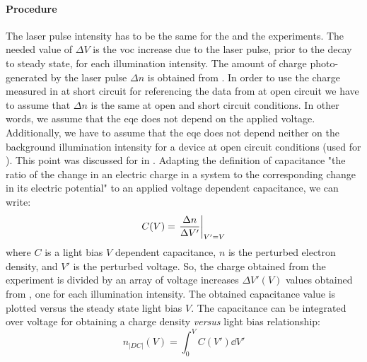 	\paragraph{Procedure}
	The laser pulse intensity has to be the same for the  and the  experiments.
	The needed value of $\Delta V$ is the \gls{voc} increase due to the laser pulse, prior to the decay to steady state, for each illumination intensity.
	The amount of charge photo\hyp{}generated by the laser pulse $\Delta n$ is obtained from .
	In order to use the charge measured in  at short circuit for referencing the data from  at open circuit we have to assume that $\Delta n$ is the same at open and short circuit conditions.
	In other words, we assume that the \gls{eqe} does not depend on the applied voltage.
	Additionally, we have to assume that the \gls{eqe} does not depend neither on the background illumination intensity for a device at open circuit conditions (used for ).
	This point was discussed for  in .
	Adapting the definition of capacitance "the ratio of the change in an electric charge in a system to the corresponding change in its electric potential" \cite{WikipediaCapacitance2019} to an applied voltage dependent capacitance, we can write:
	\begin{equation}\label{eq:dc}
		C(V) = \eval{\frac{\Delta n}{\Delta V'}}_{V'=V}
	\end{equation}
	where $C$ is a light bias $V$ dependent capacitance, $n$ is the perturbed electron density, and $V'$ is the perturbed voltage.
	So, the charge obtained from the  experiment is divided by an array of voltage increases $\Delta V'(V)$ values obtained from , one for each illumination intensity.
	The obtained capacitance value is plotted versus the steady state light bias $V$.
	The capacitance can be integrated over voltage for obtaining a charge density \textsl{versus} light bias relationship:
	\begin{equation}\label{eq:dc_charge}
		n_|DC|(V) = \int_{0}^{V} C(V') \dd V'
	\end{equation}
